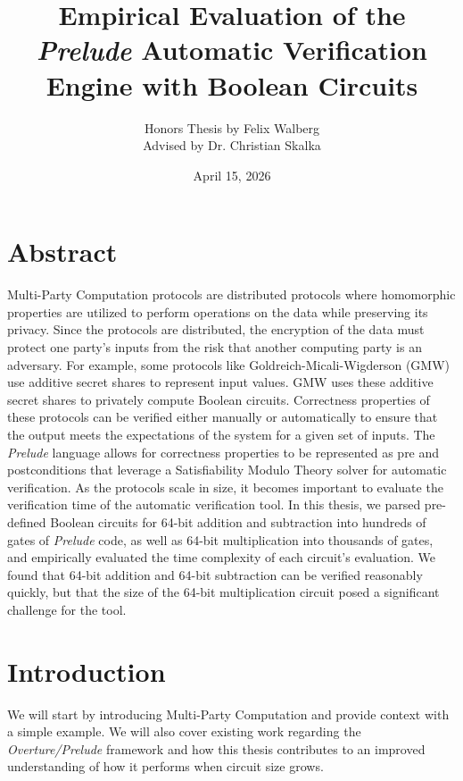 \documentclass{article}
\title{Empirical Evaluation of the \textit{Prelude} Automatic Verification Engine with Boolean Circuits}
\author{Honors Thesis by Felix Walberg\\Advised by Dr. Christian Skalka}
\date{April 15, 2026}
\begin{document}
\maketitle
\section{Abstract}
Multi-Party Computation protocols are distributed protocols where homomorphic properties are utilized to perform operations on the data while preserving its privacy. Since the protocols are distributed, the encryption of the data must protect one party's inputs from the risk that another computing party is an adversary. For example, some protocols like Goldreich-Micali-Wigderson (GMW) use additive secret shares to represent input values. GMW uses these additive secret shares to privately compute Boolean circuits. Correctness properties of these protocols can be verified either manually or automatically to ensure that the output meets the expectations of the system for a given set of inputs. The \textit{Prelude} language allows for correctness properties to be represented as pre and postconditions that leverage a Satisfiability Modulo Theory solver for automatic verification. As the protocols scale in size, it becomes important to evaluate the verification time of the automatic verification tool. In this thesis, we parsed pre-defined Boolean circuits for 64-bit addition and subtraction into hundreds of gates of \textit{Prelude} code, as well as 64-bit multiplication into thousands of gates, and empirically evaluated the time complexity of each circuit's evaluation. We found that 64-bit addition and 64-bit subtraction can be verified reasonably quickly, but that the size of the 64-bit multiplication circuit posed a significant challenge for the tool.
\section{Introduction}
We will start by introducing Multi-Party Computation and provide context with a simple example. We will also cover existing work regarding the \textit{Overture/Prelude} framework and how this thesis contributes to an improved understanding of how it performs when circuit size grows.
\end{document}
